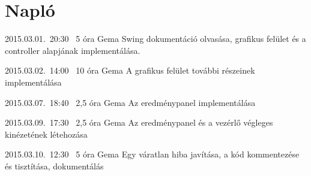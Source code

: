 %
\section{Napló}

\begin{naplo}

\bejegyzes
{2015.03.01.~20:30~} %
{5 óra} %
{Gema} %
{Swing dokumentáció olvasása, grafikus felület és a controller alapjának implementálása.} %

\bejegyzes
{2015.03.02.~14:00~} %
{10 óra} %
{Gema} %
{A grafikus felület további részeinek implementálása} %

\bejegyzes
{2015.03.07.~18:40~} %
{2,5 óra} %
{Gema} %
{Az eredménypanel implementálása} %

\bejegyzes
{2015.03.09.~17:30~} %
{2,5 óra} %
{Gema} %
{Az eredménypanel és a vezérlő végleges kinézetének létehozása} %

\bejegyzes
{2015.03.10.~12:30~} %
{5 óra} %
{Gema} %
{Egy váratlan hiba javítása, a kód kommentezése és tisztítása, dokumentálás} %

\end{naplo}

